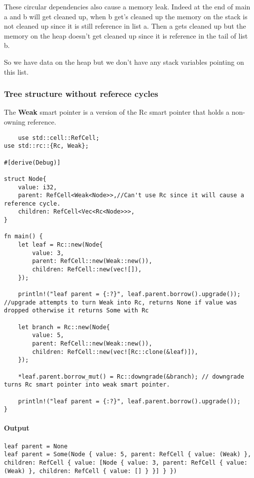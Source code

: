 These circular dependencies also cause a memory leak. Indeed at the end of main a and b will get cleaned up, when b get's cleaned up the memory on the stack is not cleaned up since it is still reference in list a. Then a gets cleaned up but the memory on the heap doesn't get cleaned up since it is reference in the tail of list b.

So we have data on the heap but we don't have any stack variables pointing on this list.

\subsubsection{Tree structure without referece cycles}
\begin{definition}
    The \textbf{Weak} smart pointer is a version of the Rc smart pointer that holds a non-owning reference.
\end{definition}

\begin{lstlisting}
    use std::cell::RefCell;
use std::rc::{Rc, Weak};

#[derive(Debug)]

struct Node{
    value: i32,
    parent: RefCell<Weak<Node>>,//Can't use Rc since it will cause a reference cycle.
    children: RefCell<Vec<Rc<Node>>>,
}

fn main() {
    let leaf = Rc::new(Node{
        value: 3,
        parent: RefCell::new(Weak::new()),
        children: RefCell::new(vec![]),
    });

    println!("leaf parent = {:?}", leaf.parent.borrow().upgrade()); //upgrade attempts to turn Weak into Rc, returns None if value was dropped otherwise it returns Some with Rc

    let branch = Rc::new(Node{
        value: 5,
        parent: RefCell::new(Weak::new()),
        children: RefCell::new(vec![Rc::clone(&leaf)]),
    });

    *leaf.parent.borrow_mut() = Rc::downgrade(&branch); // downgrade turns Rc smart pointer into weak smart pointer. 

    println!("leaf parent = {:?}", leaf.parent.borrow().upgrade()); 
}
\end{lstlisting}

\paragraph*{Output}\begin{lstlisting}
leaf parent = None
leaf parent = Some(Node { value: 5, parent: RefCell { value: (Weak) }, children: RefCell { value: [Node { value: 3, parent: RefCell { value: (Weak) }, children: RefCell { value: [] } }] } })
\end{lstlisting}

